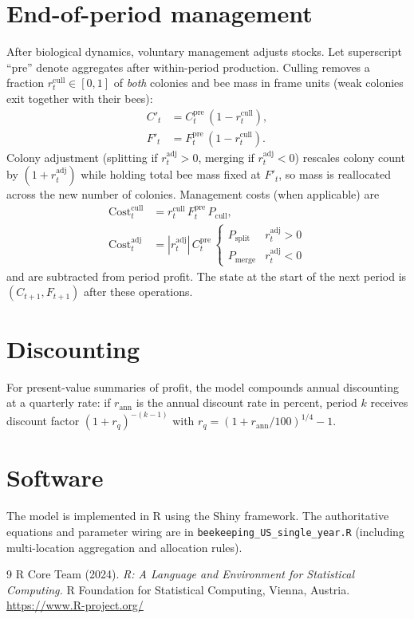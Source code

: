 \documentclass[11pt]{article}
\begin{document}
\section{End-of-period management}

After biological dynamics, voluntary management adjusts stocks. Let superscript ``pre'' denote aggregates after within-period production. Culling removes a fraction $r^{\mathrm{cull}}_t\in[0,1]$ of \emph{both} colonies and bee mass in frame units (weak colonies exit together with their bees):
\begin{align}
C'_{t} &= C^{\mathrm{pre}}_{t}\,(1-r^{\mathrm{cull}}_{t}), \\
F'_{t} &= F^{\mathrm{pre}}_{t}\,(1-r^{\mathrm{cull}}_{t}).
\end{align}
Colony adjustment (splitting if $r^{\mathrm{adj}}_t>0$, merging if $r^{\mathrm{adj}}_t<0$) rescales colony count by $(1+r^{\mathrm{adj}}_t)$ while holding total bee mass fixed at $F'_{t}$, so mass is reallocated across the new number of colonies. Management costs (when applicable) are
\begin{align}
\mathrm{Cost}^{\mathrm{cull}}_{t} &= r^{\mathrm{cull}}_{t}\, F^{\mathrm{pre}}_{t}\, P_{\mathrm{cull}}, \\
\mathrm{Cost}^{\mathrm{adj}}_{t} &= |r^{\mathrm{adj}}_{t}|\, C^{\mathrm{pre}}_{t}\, \begin{cases}
P_{\mathrm{split}} & r^{\mathrm{adj}}_t>0 \\
P_{\mathrm{merge}} & r^{\mathrm{adj}}_t<0
\end{cases}
\end{align}
and are subtracted from period profit. The state at the start of the next period is $(C_{t+1},F_{t+1})$ after these operations.

\section{Discounting}

For present-value summaries of profit, the model compounds annual discounting at a quarterly rate: if $r_{\mathrm{ann}}$ is the annual discount rate in percent, period $k$ receives discount factor $(1+r_q)^{-(k-1)}$ with $r_q=(1+r_{\mathrm{ann}}/100)^{1/4}-1$.

\section{Software}

The model is implemented in R \cite{Rcore} using the Shiny framework. The authoritative equations and parameter wiring are in \texttt{beekeeping\_US\_single\_year.R} (including multi-location aggregation and allocation rules).

\begin{thebibliography}{9}
R Core Team (2024).
\textit{R: A Language and Environment for Statistical Computing.}
R Foundation for Statistical Computing, Vienna, Austria.
\url{https://www.R-project.org/}
\end{thebibliography}
\end{document}
